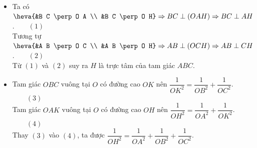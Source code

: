\begin{ex}
{\begin{itemize}
   Do đó $A K$ là đường cao của tam giác $A B C$, đồng thời $K$ nằm giữa $B$ và $C$ nên các góc $\widehat{A B C}, \widehat{A C B}$ là góc  nhọn.\\
   Tương tự, kẻ đường cao $O E$ của tam giác vuông $O A B$ thì $E$ nằm giữa hai điểm $A$ và $B$.\\ 
   Ta có $\heva{&A B \perp O E \\& A B \perp O C} \Rightarrow A B \perp(O C E) \Rightarrow A  B \perp C E$.\\
   Do đó $C E$ là đường cao tam  giác $A B C$, đồng thời $E$ nằm giữa hai điểm $A$ và $B$ nên các góc $\widehat{A B C}$, $\widehat{C A B}$ là góc nhọn.\\
   Vậy tam  giác $A B C$ có ba góc đều là góc nhọn.
   \item Ta có  $\heva{&B C \perp O A \\ &B C \perp O H} \Rightarrow B C \perp(O A H) \Rightarrow B C \perp A H$.$\qquad (1)$\\
   Tương tự $\heva{&A B \perp O C \\ &A  B \perp O H} \Rightarrow A B \perp(O C H) \Rightarrow A B \perp C H$.$\qquad (2)$\\
    Từ $(1)$ và $(2)$ suy ra $H$ là trực tâm của tam giác $A B C$.
   \item Tam giác $O B C$ vuông tại $O$ có đường cao $O K$ nên $\dfrac{1}{O K^2}=\dfrac{1}{O  B^2}+\dfrac{1}{O C^2}$.$\qquad (3)$\\
   Tam giác $O A K$ vuông tại $O$ có đường cao $O H$ nên $\dfrac{1}{O  H^2}=\dfrac{1}{O A^2}+\dfrac{1}{O K^2}$.$\qquad (4)$\\
   Thay $(3)$ vào $(4)$, ta được $\dfrac{1}{O H^2}=\dfrac{1}{O A^2}+\dfrac{1}{O B^2}+\dfrac{1}{O  C^2}$.
  \end{itemize}
  }
\end{ex}

